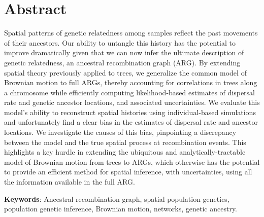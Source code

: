 \section*{Abstract} 

Spatial patterns of genetic relatedness among samples reflect the past movements of their ancestors. Our ability to untangle this history has the potential to improve dramatically given that we can now infer the ultimate description of genetic relatedness, an ancestral recombination graph (ARG). By extending spatial theory previously applied to trees, we generalize the common model of Brownian motion to full ARGs, thereby accounting for correlations in trees along a chromosome while efficiently computing likelihood-based estimates of dispersal rate and genetic ancestor locations, and associated uncertainties. We evaluate this model's ability to reconstruct spatial histories using individual-based simulations and unfortunately find a clear bias in the estimates of dispersal rate and ancestor locations. We investigate the causes of this bias, pinpointing a discrepancy between the model and the true spatial process at recombination events. This highlights a key hurdle in extending the ubiquitous and analytically-tractable model of Brownian motion from trees to ARGs, which otherwise has the potential to provide an efficient method for spatial inference, with uncertainties, using all the information available in the full ARG.





\textbf{Keywords}: Ancestral recombination graph, spatial population genetics, population genetic inference, Brownian motion, networks, genetic ancestry.  

